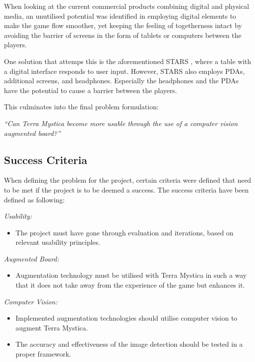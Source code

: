 When looking at the current commercial products combining digital and physical media, an unutilised potential was identified in employing digital elements to make the game flow smoother, yet keeping the feeling of togetherness intact by avoiding the barrier of screens in the form of tablets or computers between the players. 

One solution that attemps this is the aforementioned STARS \citep{magStars}, where a table with a digital interface responds to user input. However, STARS also employs PDAs, additional screens, and headphones. Especially the headphones and the PDAs have the potential to cause a barrier between the players.

This culminates into the final problem formulation:

\textit{“Can Terra Mystica become more usable through the use of a computer vision augmented board?”}

\subsection{Success Criteria}
When defining the problem for the project, certain criteria were defined that need to be met if the project is to be deemed a success. The success criteria have been defined as following:

\textit{Usability:}
\begin{itemize}
	\item The project must have gone through evaluation and iterations, based on relevant usability principles.
\end{itemize}
\textit{Augmented Board:}
\begin{itemize}
	\item Augmentation technology must be utilised with Terra Mystica in such a way that it does not take away from the experience of the game but enhances it.
\end{itemize}
\textit{Computer Vision:}
\begin{itemize}
	\item Implemented augmentation technologies should utilise computer vision to augment Terra Mystica.
	\item The accuracy and effectiveness of the image detection should be tested in a proper framework.
\end{itemize} 